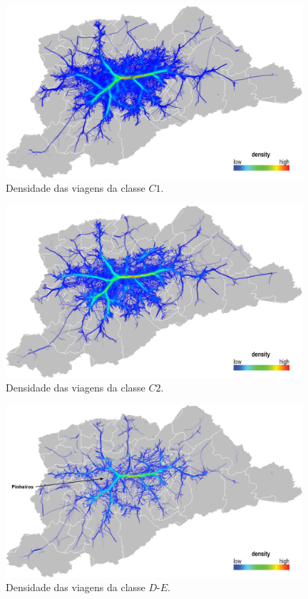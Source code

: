 \begin{figure}[!htb]
  \centering
  \captionsetup{justification=centering}
  \includegraphics[width=0.98\textwidth]{../figuras/4-class-c1.png}
  \caption{Densidade das viagens da classe $C1$. \label{fig:becc-c1}}
\end{figure}

\begin{figure}[!htb]
  \centering
  \captionsetup{justification=centering}
  \includegraphics[width=0.98\textwidth]{../figuras/5-class-c2.png}
  \caption{Densidade das viagens da classe $C2$. \label{fig:becc-c2}}
\end{figure}

\begin{figure}[!htb]
  \centering
  \captionsetup{justification=centering}
  \includegraphics[width=0.98\textwidth]{../figuras/6-class-d-e.png}
  \caption{Densidade das viagens da classe $D$-$E$. \label{fig:becc-d-e}}
\end{figure}

